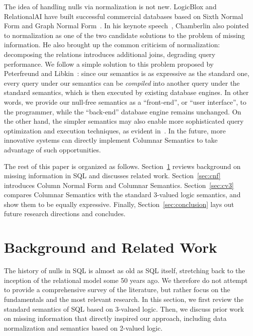 \documentclass[sigconf]{acmart}
\begin{document}
The idea of handling nulls via normalization is not new.
LogicBlox and RelationalAI have built
 successful commercial databases based on Sixth Normal Form
 and Graph Normal Form~\cite{
  DBLP:books/daglib/0014409,
  RAIDocumentation,
  DBLP:conf/sigmod/ArefCGKOPVW15}.
In his keynote speech~\cite{DBLP:conf/sigmod/Chamberlin23},
 Chamberlin also pointed to normalization as 
 one of the two candidate solutions 
 to the problem of missing information.
He also brought up the common criticism of normalization:
 decomposing the relations introduces additional joins,
 degrading query performance.
We follow a simple solution to this problem
 proposed by Peterfreund and Libkin~\cite{DBLP:conf/pods/LibkinP23}: 
 since our semantics is as expressive as the standard one,
 every query under our semantics can be {\em compiled} 
 into another query under the standard semantics,
 which is then executed by existing database engines.
In other words, we provide our null-free semantics as a
 ``front-end'', or ``user interface'', to the  programmer,
 while the ``back-end'' database engine remains unchanged.
On the other hand, the simpler semantics may also enable
 more sophisticated query optimization and execution techniques, 
 as evident in~\cite{DBLP:conf/pods/LibkinP23,DBLP:conf/sigmod/ArefCGKOPVW15,RAIDocumentation}.
In the future, more innovative systems can 
 directly implement Columnar Semantics 
 to take advantage of such opportunities.

The rest of this paper is organized as follows.
Section~\ref{sec:background} reviews background 
 on missing information in SQL and discusses related work.
Section~\ref{sec:cnf} introduces Column Normal Form and Columnar Semantics.
Section~\ref{sec:cv3} compares Columnar Semantics with the standard 3-valued logic semantics, 
 and show them to be equally expressive.
Finally, Section~\ref{sec:conclusion}
 lays out future research directions and concludes.

\section{Background and Related Work}
\label{sec:background}

The history of nulls in SQL is almost as old as SQL itself,
 stretching back to the inception of the relational model some 50 years ago.
We therefore do not attempt to provide a comprehensive survey of the literature, 
 but rather focus on the fundamentals and the most relevant research.
In this section, we first review the standard semantics of SQL
 based on 3-valued logic.
Then, we discuss prior work on missing information that directly 
 inspired our approach,
 including data normalization and semantics based on 2-valued logic.
\end{document}

